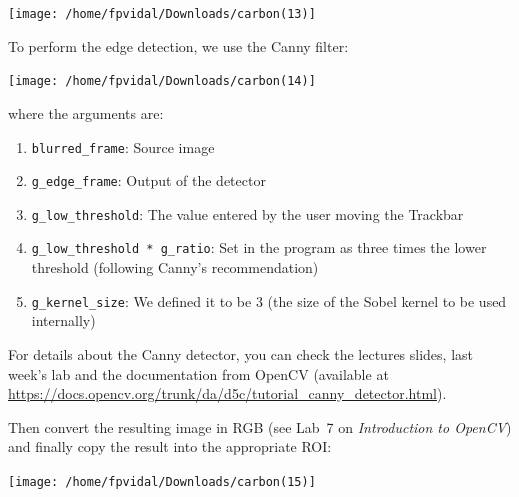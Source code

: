 \documentclass[english,a4paper,12pt,oneside]{article}
\begin{document}
\texttt{[image: /home/fpvidal/Downloads/carbon(13)]}


To perform the edge detection, we use the Canny filter:

\begin{center}
\texttt{[image: /home/fpvidal/Downloads/carbon(14)]}
\end{center}

where the arguments are:
\begin{enumerate}
    \item \verb+blurred_frame+: Source image
    \item \verb+g_edge_frame+: Output of the detector
    \item \verb+g_low_threshold+: The value entered by the user moving the Trackbar
    \item \verb+g_low_threshold * g_ratio+: Set in the program as three times the lower threshold (following Canny's recommendation)
    \item \verb+g_kernel_size+: We defined it to be 3 (the size of the Sobel kernel to be used internally)
\end{enumerate}
For details about the Canny detector, you can check the lectures slides, last week's lab and the documentation from OpenCV (available at \url{https://docs.opencv.org/trunk/da/d5c/tutorial_canny_detector.html}).

Then convert the resulting image in RGB (see Lab~7 on \textit{Introduction to OpenCV}) and finally copy the result into the appropriate ROI:

\begin{center}
\texttt{[image: /home/fpvidal/Downloads/carbon(15)]}
\end{center}
\end{document}
